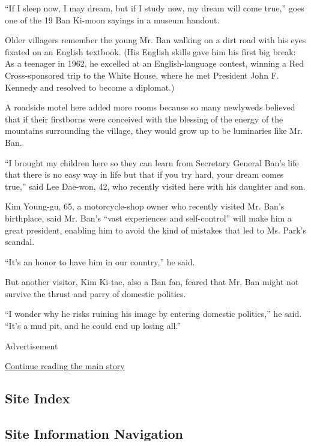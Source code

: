 ``If I sleep now, I may dream, but if I study now, my dream will come
true,'' goes one of the 19 Ban Ki-moon sayings in a museum handout.

Older villagers remember the young Mr. Ban walking on a dirt road with
his eyes fixated on an English textbook. (His English skills gave him
his first big break: As a teenager in 1962, he excelled at an
English-language contest, winning a Red Cross-sponsored trip to the
White House, where he met President John F. Kennedy and resolved to
become a diplomat.)

A roadside motel here added more rooms because so many newlyweds
believed that if their firstborns were conceived with the blessing of
the energy of the mountains surrounding the village, they would grow up
to be luminaries like Mr. Ban.

``I brought my children here so they can learn from Secretary General
Ban's life that there is no easy way in life but that if you try hard,
your dream comes true,'' said Lee Dae-won, 42, who recently visited here
with his daughter and son.

Kim Young-gu, 65, a motorcycle-shop owner who recently visited Mr. Ban's
birthplace, said Mr. Ban's ``vast experiences and self-control'' will
make him a great president, enabling him to avoid the kind of mistakes
that led to Ms. Park's scandal.

``It's an honor to have him in our country,'' he said.

But another visitor, Kim Ki-tae, also a Ban fan, feared that Mr. Ban
might not survive the thrust and parry of domestic politics.

``I wonder why he risks ruining his image by entering domestic
politics,'' he said. ``It's a mud pit, and he could end up losing all.''

Advertisement

\protect\hyperlink{after-bottom}{Continue reading the main story}

\hypertarget{site-index}{%
\subsection{Site Index}\label{site-index}}

\hypertarget{site-information-navigation}{%
\subsection{Site Information
Navigation}\label{site-information-navigation}}

